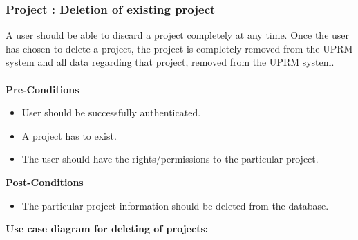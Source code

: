 \subsubsection{Project : Deletion of existing project}
A user should be able to discard a project completely at any time. Once the user has chosen to delete a project, the project is completely removed from the UPRM system and all data regarding that project, removed from the UPRM system.\\ \\
\textbf{Pre-Conditions}
\begin{itemize}
	\item User should be successfully authenticated.
	\item A project has to exist.
	\item The user should have the rights/permissions to the particular project.\\
\end{itemize}
\textbf{Post-Conditions}
\begin{itemize}
	\item The particular project information should be deleted from the database.\\
\end{itemize}
\textbf{Use case diagram for deleting of projects: }\\
\centerline{}